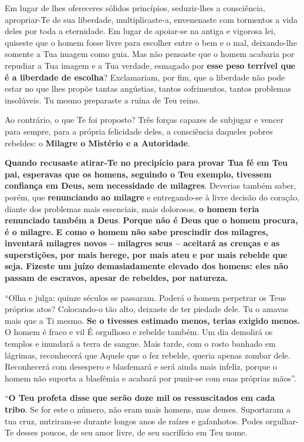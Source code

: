 Em lugar de lhes ofereceres sólidos princípios, seduzir-lhes a
consciência, apropriar-Te de sua liberdade, multiplicaste-a, envenenaste
com tormentos a vida deles por toda a eternidade. Em lugar de apoiar-se
na antiga e vigorosa lei, quiseste que o homem fosse livre para escolher
entre o bem e o mal, deixando-lhe somente a Tua imagem como guia. Mas
não pensaste que o homem acabaria por repudiar a Tua imagem e a Tua
verdade, esmagado por \textbf{esse peso terrível que é a liberdade de
escolha}? Exclamariam, por fim, que a liberdade não pode estar no que
lhes propõe tantas angústias, tantos sofrimentos, tantos problemas
insolúveis. Tu mesmo preparaste a ruína de Teu reino.

Ao contrário, o que Te foi proposto? Três forças capazes de subjugar e
vencer para sempre, para a própria felicidade deles, a consciência
daqueles pobres rebeldes: o \textbf{Milagre o Mistério e a Autoridade}.

\textbf{Quando recusaste atirar-Te no precipício para provar Tua fé em
Teu pai, esperavas que os homens, seguindo o Teu exemplo, tivessem
confiança em Deus, sem necessidade de milagres}. Deverias também saber,
porém, que \textbf{renunciando ao milagre} e entregando-se à livre
decisão do coração, diante dos problemas mais essenciais, mais
dolorosos, \textbf{o homem teria renunciado também a Deus}.
\textbf{Porque não é Deus que o homem procura, é o milagre.} \textbf{E
como o homem não sabe prescindir dos milagres, inventará milagres novos
-- milagres seus -- aceitará as crenças e as superstições, por mais
herege, por mais ateu e por mais rebelde que seja. Fizeste um juízo
demasiadamente elevado dos homens: eles não passam de escravos, apesar
de rebeldes, por natureza.}

``Olha e julga: quinze séculos se passaram. Poderá o homem perpetrar os
Teus próprios atos? Colocando-o tão alto, deixaste de ter piedade dele.
Tu o amavas mais que a Ti mesmo. \textbf{Se o tivesses estimado menos,
terias exigido menos.} O homem é fraco e vil É orgulhoso e rebelde
também. Um dia demolirá os templos e inundará a terra de sangue. Mais
tarde, com o rosto banhado em lágrimas, reconhecerá que Aquele que o fez
rebelde, queria apenas zombar dele. Reconhecerá com desespero e
blasfemará e será ainda mais infeliz, porque o homem não suporta a
blasfêmia e acabará por punir-se com suas próprias mãos''.

``\textbf{O Teu profeta disse que serão doze mil os ressuscitados em
cada tribo}. Se for este o número, não eram mais homens, mas deuses.
Suportaram a tua cruz, nutriram-se durante longos anos de raízes e
gafanhotos. Podes orgulhar-Te desses poucos, de seu amor livre, de seu
sacrifício em Teu nome.

